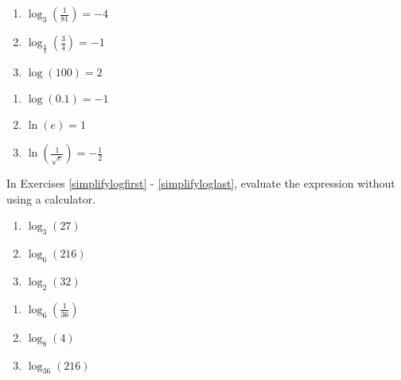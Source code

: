 \documentclass{ximera}
\begin{document}
\begin{multicols}{3}
\begin{enumerate}
\setcounter{enumi}{\value{HW}}

\item  $\log_{3} \left(\frac{1}{81} \right) = -4$  

\item  $\log_{\frac{4}{3}} \left(\frac{3}{4} \right) = -1$  

\item  $\log(100) = 2$  

\setcounter{HW}{\value{enumi}}
\end{enumerate}
\end{multicols}

\begin{multicols}{3}
\begin{enumerate}
\setcounter{enumi}{\value{HW}}

\item  $\log (0.1) = -1$  

\item  $\ln(e) = 1$ 

\item  $\ln\left(\frac{1}{\sqrt{e}}\right) = -\frac{1}{2}$  \label{rewritelastex}

\setcounter{HW}{\value{enumi}}
\end{enumerate}
\end{multicols}

In Exercises \ref{simplifylogfirst} - \ref{simplifyloglast}, evaluate the expression without using a calculator.

\begin{multicols}{3}
\begin{enumerate}
\setcounter{enumi}{\value{HW}}

\item $\log_{3} (27)$  \label{simplifylogfirst}
\item $\log_{6} (216)$
\item $\log_{2} (32)$

\setcounter{HW}{\value{enumi}}
\end{enumerate}
\end{multicols}


\begin{multicols}{3}
\begin{enumerate}
\setcounter{enumi}{\value{HW}}

\item  $\log_{6} \left( \frac{1}{36} \right)$
\item $\log_{8} (4)$
\item $\log_{36} (216)$

\setcounter{HW}{\value{enumi}}
\end{enumerate}
\end{multicols}
\end{document}
